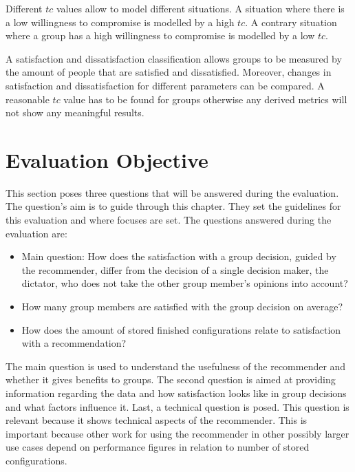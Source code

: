 
Different $tc$ values allow to model different situations. A situation where there is a low willingness to compromise is modelled by a high $tc$. A contrary situation where a group has a high willingness to compromise is modelled by a low $tc$.

A satisfaction and dissatisfaction classification allows groups to be measured by the amount of people that are satisfied and dissatisfied. Moreover, changes in satisfaction and dissatisfaction for different parameters can be compared. A reasonable $tc$ value has to be found for groups otherwise any derived metrics will not show any meaningful results.

\section{Evaluation Objective}
\label{sec:Evaluation:Questions}

This section poses three questions that will be answered during the evaluation. The question's aim is to guide through this chapter. They set the guidelines for this evaluation and where focuses are set. The questions answered during the evaluation are:

\begin{itemize}
    \item Main question: How does the satisfaction with a group decision, guided by the recommender, differ from the decision of a single decision maker, the dictator, who does not take the other group member's opinions into account?
    \item How many group members are satisfied with the group decision on average?
    \item How does the amount of stored finished configurations relate to satisfaction with a recommendation?
\end{itemize}

The main question is used to understand the usefulness of the recommender and whether it gives benefits to groups. The second question is aimed at providing information regarding the data and how satisfaction looks like in group decisions and what factors influence it. Last, a technical question is posed. This question is relevant because it shows technical aspects of the recommender. This is important because other work for using the recommender in other possibly larger use cases depend on performance figures in relation to number of stored configurations.


